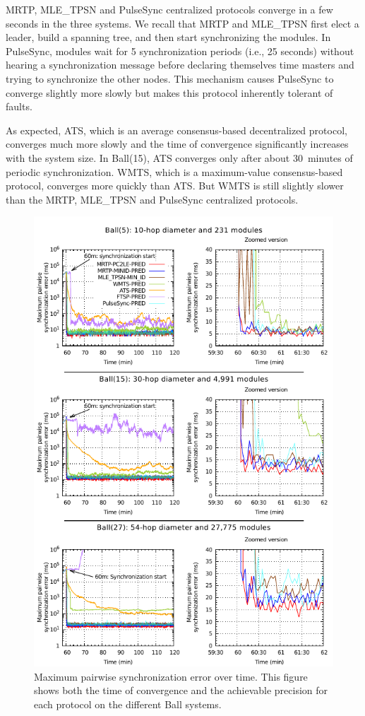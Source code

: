 MRTP, MLE\_TPSN and PulseSync centralized protocols converge in a few seconds in the three systems. We recall that MRTP and MLE\_TPSN first elect a leader, build a spanning tree, and then start synchronizing the modules. In PulseSync, modules wait for 5 synchronization periods (i.e., 25 seconds) without hearing a synchronization message before declaring themselves time masters and trying to synchronize the other nodes. This mechanism causes PulseSync to converge slightly more slowly but makes this protocol inherently tolerant of faults.

As expected, ATS, which is an average consensus-based decentralized protocol, converges much more slowly and the time of convergence significantly increases with the system size. In Ball(15), ATS converges only after about 30~minutes of periodic synchronization. WMTS, which is a maximum-value consensus-based protocol, converges more quickly than ATS. But WMTS is still slightly slower than the MRTP, MLE\_TPSN and PulseSync centralized protocols.

\begin{figure}[h!]
	\centering
	\includegraphics[width=0.93\linewidth]{images/time-synchronization/error-time-all-2x3}
	\caption{Maximum pairwise synchronization error over time. This figure shows both the time of convergence and the achievable precision for each protocol on the different Ball systems.} 
	\label{fig:time-sync:error-time-all}
\end{figure}

